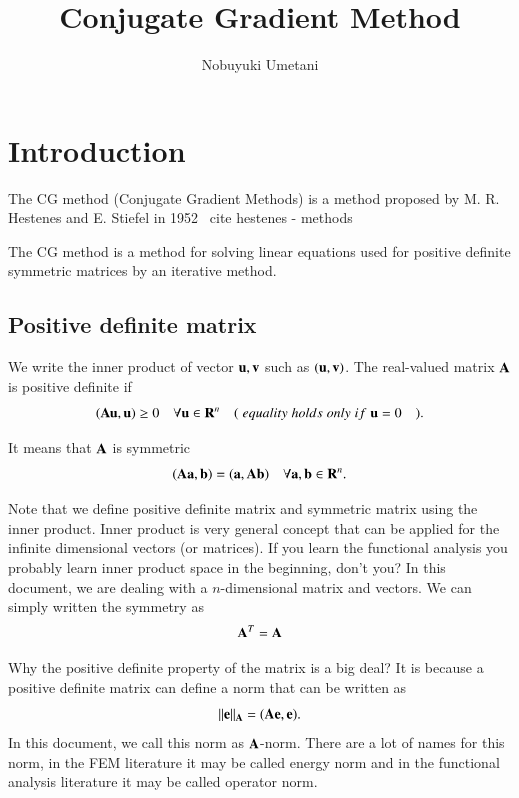 



\title{Conjugate Gradient Method}
\author{Nobuyuki Umetani}

\maketitle
\tableofcontents


\section{Introduction}

The CG method (Conjugate Gradient Methods) is a method proposed by M. R. Hestenes and E. Stiefel in 1952 \ cite {hestenes - methods}

The CG method is a method for solving linear equations used for positive definite symmetric matrices by an iterative method.


\subsection{Positive definite matrix}

We write the inner product of vector $\mathbf{u},\mathbf{v}$ such as $(\mathbf{u},\mathbf{v})$.
%
The real-valued matrix $\mathbf{A}$ is positive definite if 
%
\begin{equation}
(\mathbf{A}\mathbf{u},\mathbf{u})\ge0 \quad \forall\mathbf{u}\in\mathbf{R}^n \quad (\;equality\;holds\;only\;if\;\mathbf{u}=0 \quad ).
\end{equation}

It means that $\mathbf{A}$ is symmetric
%
\begin{equation}
(\mathbf{A}\mathbf{a},\mathbf{b})=(\mathbf{a},\mathbf{A}\mathbf{b}) \quad \forall\mathbf{a},\mathbf{b}\in\mathbf{R}^n.
\end{equation}


Note that we define positive definite matrix and symmetric matrix using the inner product. 
%
Inner product is very general concept that can be applied for the infinite dimensional vectors (or matrices).
%
If you learn the functional analysis you probably learn inner product space in the beginning, don't you?
%
In this document, we are dealing with a $n$-dimensional matrix and vectors.
%
We can simply written the symmetry as
\begin{eqnarray}
\mathbf{A}^T = \mathbf{A}
\end{eqnarray}
 
 

Why the positive definite property of the matrix is a big deal?
%
It is because a positive definite matrix can define a norm that can be written as
%
\begin{equation}
||\mathbf{e}||_{\mathbf{A}} = (\mathbf{A}\mathbf{e},\mathbf{e}).
\end{equation}
%
In this document, we call this norm as $\mathbf{A}$-norm. 
%
There are a lot of names for this norm, in the FEM literature it may be called energy norm and in the functional analysis literature it may be called operator norm. 
%


